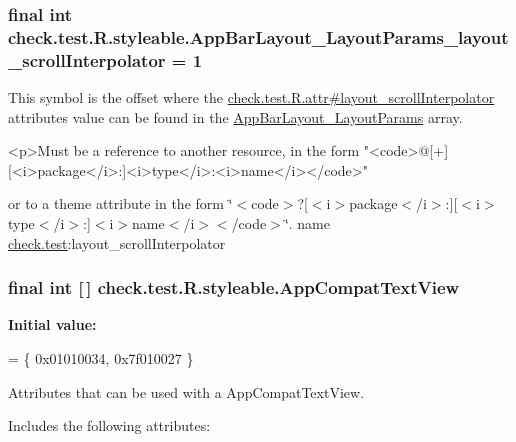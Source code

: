 \subsubsection[{App\+Bar\+Layout\+\_\+\+Layout\+Params\+\_\+layout\+\_\+scroll\+Interpolator}]{\setlength{\rightskip}{0pt plus 5cm}final int check.\+test.\+R.\+styleable.\+App\+Bar\+Layout\+\_\+\+Layout\+Params\+\_\+layout\+\_\+scroll\+Interpolator = 1\hspace{0.3cm}{\ttfamily [static]}}\label{classcheck_1_1test_1_1_r_1_1styleable_a8466df23f54f293c6b7257f630ad0862}
This symbol is the offset where the \hyperlink{classcheck_1_1test_1_1_r_1_1attr_adac9c4882ddd233e198cfa1a87d563d1}{check.\+test.\+R.\+attr\#layout\+\_\+scroll\+Interpolator} attribute\textquotesingle{}s value can be found in the \hyperlink{classcheck_1_1test_1_1_r_1_1styleable_adbe27e505a2c53030b9f1cc91b81a452}{App\+Bar\+Layout\+\_\+\+Layout\+Params} array.

\begin{DoxyVerb}      <p>Must be a reference to another resource, in the form "<code>@[+][<i>package</i>:]<i>type</i>:<i>name</i></code>"
\end{DoxyVerb}
 or to a theme attribute in the form \char`\"{}$<$code$>$?\mbox{[}$<$i$>$package$<$/i$>$\+:\mbox{]}\mbox{[}$<$i$>$type$<$/i$>$\+:\mbox{]}$<$i$>$name$<$/i$>$$<$/code$>$\char`\"{}.  name \hyperlink{namespacecheck_1_1test}{check.\+test}\+:layout\+\_\+scroll\+Interpolator \hypertarget{classcheck_1_1test_1_1_r_1_1styleable_a07bf5a828a4906262f29b961bc851581}{}
\subsubsection[{App\+Compat\+Text\+View}]{\setlength{\rightskip}{0pt plus 5cm}final int \mbox{[}$\,$\mbox{]} check.\+test.\+R.\+styleable.\+App\+Compat\+Text\+View\hspace{0.3cm}{\ttfamily [static]}}\label{classcheck_1_1test_1_1_r_1_1styleable_a07bf5a828a4906262f29b961bc851581}
{\bfseries Initial value\+:}
\begin{DoxyCode}
= \{
            0x01010034, 0x7f010027
        \}
\end{DoxyCode}
Attributes that can be used with a App\+Compat\+Text\+View. 

Includes the following attributes\+:

